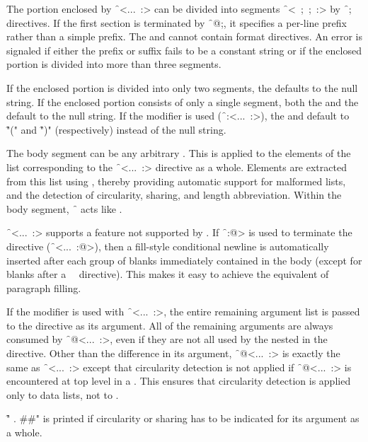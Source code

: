 The  portion enclosed by \f{~<...~:>} can be divided
into segments \f{~<~;~;~:>}
by \f{~;} directives.  If the first section is terminated by \f{~@;}, 
it specifies a per-line prefix rather than a simple prefix.  
The  and  cannot contain format directives.  
An error is signaled if either the prefix or suffix fails to be a
constant string or if the enclosed portion is divided into more than three segments.
 
If the enclosed portion is divided into only two segments, the 
defaults to the null string.  If the enclosed portion consists of only
a single segment, both the  and the  default to 
the null string.  If the  modifier is used (\ie \f{~:<...~:>}),
the  and  default to \f{"("} and \f{")"}
(respectively) instead of the null string.
 
The body segment can be any arbitrary .
This  is applied to the elements of the list
corresponding to the \f{~<...~:>} directive as a whole.
Elements are extracted from this list using ,
thereby providing automatic support for malformed lists, and the detection
of circularity, sharing, and length abbreviation.
Within the body segment, \f{~\hat } acts like .
 
\f{~<...~:>} supports a feature not supported by .
If \f{~:@>} is used to terminate the directive (\ie \f{~<...~:@>}), 
then a fill-style conditional newline is automatically inserted after each
group of blanks immediately contained in the body (except for blanks
after a ~\NewlineChar\ directive).  This makes it easy to achieve the
equivalent of paragraph filling.
 
If the  modifier is used with \f{~<...~:>}, the entire remaining argument
list is passed to the directive as its argument.  All of the remaining
arguments are always consumed by \f{~@<...~:>}, even if they are not all used
by the  nested in the directive.  Other than the difference in
its argument, \f{~@<...~:>} is exactly the same as \f{~<...~:>} except that
circularity detection is not applied if \f{~@<...~:>} is encountered at top
level in a .  This ensures that circularity detection is
applied only to data lists, not to  .

\f{" . \#\#"} is printed if circularity or sharing has to be indicated
for its argument as a whole.
 
